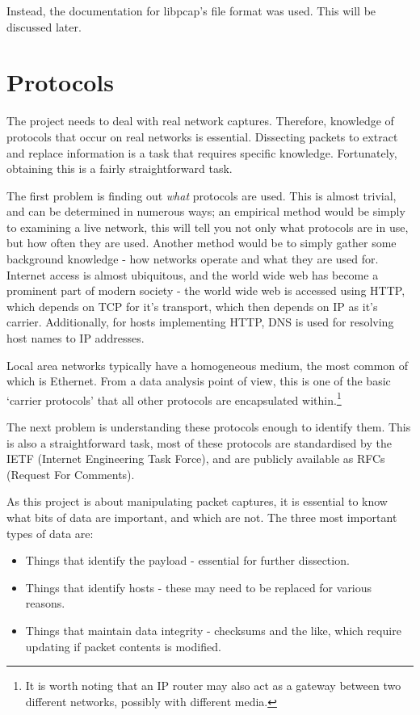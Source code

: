 \documentclass[10pt,a4paper,notitlepage]{report}
\begin{document}
Instead, the documentation for libpcap's file format was used. This will be discussed later.

\section{Protocols}
The project needs to deal with real network captures. Therefore, knowledge of protocols that occur on real networks is essential. Dissecting packets to extract and replace information is a task that requires specific knowledge. Fortunately, obtaining this is a fairly straightforward task.

The first problem is finding out \emph{what} protocols are used. This is almost trivial, and can be determined in numerous ways; an empirical method would be simply to examining a live network, this will tell you not only what protocols are in use, but how often they are used.
Another method would be to simply gather some background knowledge - how networks operate and what they are used for. Internet access is almost ubiquitous, and the world wide web has become a prominent part of modern society - the world wide web is accessed using HTTP, which depends on TCP for it's transport, which then depends on IP as it's carrier. Additionally, for hosts implementing HTTP, DNS is used for resolving host names to IP addresses.

Local area networks typically have a homogeneous medium, the most common of which is Ethernet. From a data analysis point of view, this is one of the basic `carrier protocols' that all other protocols are encapsulated within.\footnote{It is worth noting that an IP router may also act as a gateway between two different networks, possibly with different media.}

The next problem is understanding these protocols enough to identify them. This is also a straightforward task, most of these protocols are standardised by the IETF (Internet Engineering Task Force), and are publicly available as RFCs (Request For Comments).

As this project is about manipulating packet captures, it is essential to know what bits of data are important, and which are not. The three most important types of data are:
\begin{itemize}
\item Things that identify the payload - essential for further dissection.
\item Things that identify hosts - these may need to be replaced for various reasons.
\item Things that maintain data integrity - checksums and the like, which require updating if packet contents is modified.
\end{itemize}
\end{document}
